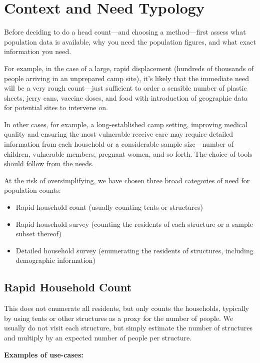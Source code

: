 \documentclass[a4paper,12pt,twoside]{article}
\begin{document}
\section{Context and Need Typology}
\begin{multicols}{2}
Before deciding to do a head count---and choosing a method---first assess what population data is available, why you need the population figures, and what exact information you need. 

For example, in the case of a large, rapid displacement (hundreds of thousands of people arriving in an unprepared camp site), it's likely that the immediate need will be a very rough count---just sufficient to order a sensible number of plastic sheets, jerry cans, vaccine doses, and food with introduction of geographic data for potential sites to intervene on.

In other cases, for example, a long-established camp setting, improving medical quality and ensuring the most vulnerable receive care may require detailed information from each household or a considerable sample size---number of children, vulnerable members, pregnant women, and so forth. The choice of tools should follow from the needs.

\end{multicols}

\newpage
At the risk of oversimplifying, we have chosen three broad categories of need for population counts:
\begin{itemize}
    \item Rapid household count (usually counting tents or structures)
    \item Rapid household survey (counting the residents of each structure or a sample subset thereof)
    \item Detailed household survey (enumerating the residents of structures, including demographic information)
\end{itemize}

\subsection{Rapid Household Count}
 This does not enumerate all residents, but only counts the households, typically by using tents or other structures as a proxy for the number of people. We usually do not visit each structure, but simply estimate the number of structures and multiply by an expected number of people per structure.

\noindent
\textbf{Examples of use-cases:}
\end{document}
